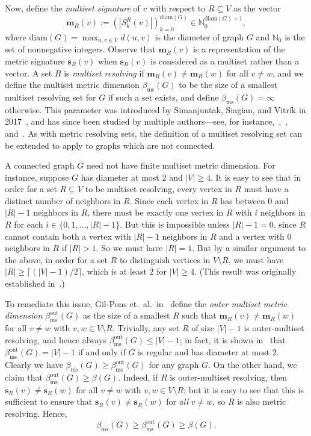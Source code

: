 \documentclass[12pt]{article}
\theoremstyle{definition}
\theoremstyle{remark}
\theoremstyle{remark}
\numberwithin{theorem}{section}
\providecommand{\N}{}
\renewcommand{\N}{{\mathbb N}}
\begin{document}
Now, define the \textit{multiset signature} of $v$ with respect to $R \subseteq V$ as the vector 
$$
	\bm{m}_{R}(v) := (|S_{k}^{R}(v)|)_{k=0}^{\text{diam}(G)} \in \N_{0}^{\text{diam}(G) + 1},
$$
where $\text{diam}(G) = \max_{u, v \in V} d(u,v)$ is the diameter of graph $G$ and $\N_{0}$ is the set of nonnegative integers. Observe that $\bm{m}_{R}(v)$ is a representation of the metric signature $\bm{s}_{R}(v)$ when $\bm{s}_{R}(v)$ is considered as a multiset rather than a vector. A set $R$ is \textit{multiset resolving} if $\bm{m}_{R}(v) \neq \bm{m}_{R}(w)$ for all $v \neq w$, and we define the multiset metric dimension $\beta_{\text{ms}}(G)$ to be the size of a smallest multiset resolving set for $G$ if such a set exists, and define $\beta_{\text{ms}}(G) = \infty$ otherwise. This parameter was introduced by Simanjuntak, Siagian, and Vitr\'{i}k in 2017~\cite{simanjuntak2017multiset}, and has since been studied by multiple authors---see, for instance,~\cite{alfarisi2020note},~\cite{bong2021some}, and~\cite{hakanen2024complexity}. As with metric resolving sets, the definition of a multiset resolving set can be extended to apply to graphs which are not connected.

A connected graph $G$ need not have finite multiset metric dimension. For instance, suppose $G$ has diameter at most $2$ and $|V| \geq 4$. It is easy to see that in order for a set $R \subseteq V$ to be multiset resolving, every vertex in $R$ must have a distinct number of neighbors in $R$. Since each vertex in $R$ has between $0$ and $|R|-1$ neighbors in $R$, there must be exactly one vertex in $R$ with $i$ neighbors in $R$ for each $i \in \{ 0,1,\dots,|R|-1 \}$. But this is impossible unless $|R|-1 = 0$, since $R$ cannot contain both a vertex with $|R|-1$ neighbors in $R$ and a vertex with $0$ neighbors in $R$ if $|R|>1$. So we must have $|R| = 1$. But by a similar argument to the above, in order for a set $R$ to distinguish vertices in $V \setminus R$, we must have $|R| \geq \lceil (|V|-1)/2 \rceil$, which is at least $2$ for $|V| \geq 4$. (This result was originally established in~\cite[Theorem~3.1]{simanjuntak2017multiset}.)

To remediate this issue, Gil-Pons et.\ al.\ in~\cite{gil2019distance} define the \textit{outer multiset metric dimension} $\beta_{\text{ms}}^{\text{out}}(G)$ as the size of a smallest $R$ such that $\bm{m}_{R}(v) \neq \bm{m}_{R}(w)$ for all $v \neq w$ with $v,w \in V \setminus R.$ Trivially, any set $R$ of size $|V|-1$ is outer-multiset resolving, and hence always $\beta_{\text{ms}}^{\text{out}}(G) \leq |V|-1$; in fact, it is shown in~\cite{klavvzar2023further} that $\beta_{\text{ms}}^{\text{out}}(G) = |V| - 1$ if and only if $G$ is regular and has diameter at most $2$. Clearly we have $\beta_{\text{ms}}(G) \geq \beta_{\text{ms}}^{\text{out}}(G)$ for any graph $G$. On the other hand, we claim that $\beta_{\text{ms}}^{\text{out}}(G) \geq \beta(G)$. Indeed, if $R$ is outer-multiset resolving, then $\bm{s}_{R}(v) \neq \bm{s}_{R}(w)$ for all $v\neq w$ with $v,w \in V \setminus R$; but it is easy to see that this is sufficient to ensure that $\bm{s}_{R}(v) \neq \bm{s}_{R}(w)$ for \textit{all} $v \neq w$, so $R$ is also metric resolving. Hence,
$$
    \beta_{\text{ms}}(G) \geq \beta_{\text{ms}}^{\text{out}}(G) \geq \beta(G).
$$
\end{document}
